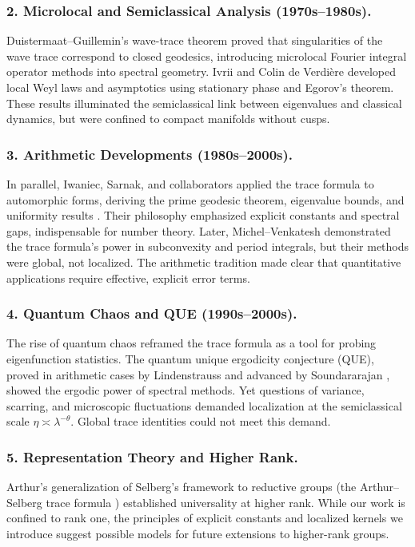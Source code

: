 \subsubsection*{2. Microlocal and Semiclassical Analysis (1970s–1980s).}
Duistermaat–Guillemin’s wave-trace theorem \cite{DG1975}
proved that singularities of the wave trace correspond to closed geodesics,
introducing microlocal Fourier integral operator methods into spectral geometry.
Ivrii \cite{Ivrii1980} and Colin de Verdière \cite{Colin1978} developed local Weyl laws
and asymptotics using stationary phase and Egorov’s theorem.
These results illuminated the semiclassical link between eigenvalues and classical dynamics,
but were confined to compact manifolds without cusps.

\subsubsection*{3. Arithmetic Developments (1980s–2000s).}
In parallel, Iwaniec, Sarnak, and collaborators applied the trace formula to automorphic forms,
deriving the prime geodesic theorem, eigenvalue bounds, and uniformity results
\cite{Iwaniec2002,LuoSarnak1995}. Their philosophy emphasized explicit constants and spectral gaps,
indispensable for number theory. Later, Michel–Venkatesh \cite{MichelVenkatesh2010}
demonstrated the trace formula’s power in subconvexity and period integrals,
but their methods were global, not localized.
The arithmetic tradition made clear that quantitative applications
require effective, explicit error terms.

\subsubsection*{4. Quantum Chaos and QUE (1990s–2000s).}
The rise of quantum chaos reframed the trace formula as a tool
for probing eigenfunction statistics.
The quantum unique ergodicity conjecture (QUE), proved in arithmetic cases
by Lindenstrauss \cite{LindenstraussQUE} and advanced by Soundararajan \cite{SoundararajanQUE},
showed the ergodic power of spectral methods.
Yet questions of variance, scarring, and microscopic fluctuations demanded
localization at the semiclassical scale $\eta\asymp\lambda^{-\theta}$.
Global trace identities could not meet this demand.

\subsubsection*{5. Representation Theory and Higher Rank.}
Arthur’s generalization of Selberg’s framework to reductive groups
(the Arthur–Selberg trace formula \cite{ArthurBook})
established universality at higher rank.
While our work is confined to rank one,
the principles of explicit constants and localized kernels we introduce
suggest possible models for future extensions to higher-rank groups.

